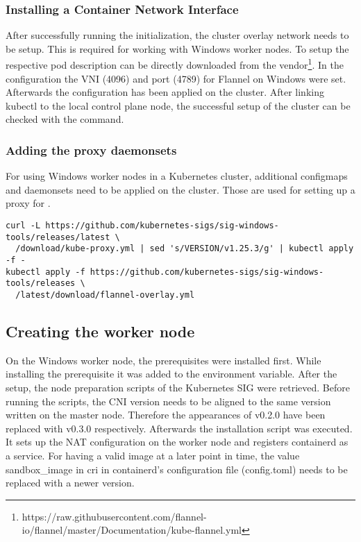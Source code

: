 \subsubsection{Installing a Container Network Interface}
After successfully running the initialization, the cluster overlay network  needs to be setup.
This is required for working with Windows worker nodes.  To setup  the respective pod description can be directly downloaded from the vendor\footnote{https://raw.githubusercontent.com/flannel-io/flannel/master/Documentation/kube-flannel.yml}. In the configuration the VNI (4096) and port (4789) for Flannel on Windows were set. Afterwards the configuration has been applied on the cluster.
After linking kubectl to the local control plane node, the successful setup of the cluster can be checked with the  command.


\subsubsection{Adding the proxy daemonsets}
For using Windows worker nodes in a Kubernetes cluster, additional configmaps and daemonsets need to be applied on the cluster. Those are used for setting up a proxy for .
\begin{lstlisting}
curl -L https://github.com/kubernetes-sigs/sig-windows-tools/releases/latest \
  /download/kube-proxy.yml | sed 's/VERSION/v1.25.3/g' | kubectl apply -f -
kubectl apply -f https://github.com/kubernetes-sigs/sig-windows-tools/releases \
  /latest/download/flannel-overlay.yml
\end{lstlisting}

\subsection{Creating the worker node}
On the Windows worker node, the prerequisites were installed first. While installing the prerequisite  it was added to the  environment variable. After the setup, the node preparation scripts of the Kubernetes \ac{SIG} were retrieved. Before running the scripts, the \ac{CNI} version needs to be aligned to the same version written on the master node. Therefore the appearances of v0.2.0 have been replaced with v0.3.0 respectively.
Afterwards the installation script was executed. It sets up the \ac{NAT} configuration on the worker node and registers containerd as a service.
For having a valid image at a later point in time, the value sandbox\_image in cri in containerd's configuration file (config.toml) needs to be replaced with a newer version.

